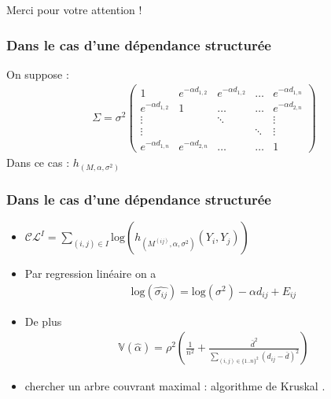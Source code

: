 \documentclass[11pt,table]{beamer}
\begin{document}
\begin{frame}
\begin{center}
Merci pour votre attention ! 
\end{center}
\end{frame}

\begin{frame}
\frametitle{Dans le cas d'une dépendance structurée}
On suppose :
\begin{align*}
\Sigma = \sigma^2 \begin{pmatrix}
1 &  e^{-\alpha d_{1,2}} &  e^{-\alpha d_{1,2}} & \ldots &  e^{- \alpha d_{1,n}}  \\
 e^{-\alpha d_{1,2}} & 1 & \ldots & \ldots &  e^{- \alpha d_{2,n}}\\
 \vdots & & \ddots & & \vdots\\
 \vdots & & & \ddots & \vdots \\
 e^{-\alpha d_{1,n}} &  e^{-\alpha d_{2,n}} & \ldots & \ldots & 1 
\end{pmatrix}
\end{align*} 
Dans ce cas : $h_{(M,\alpha,\sigma^2)}$
\end{frame}

\begin{frame}
\frametitle{Dans le cas d'une dépendance structurée}
\begin{itemize}
\item $\mathcal{CL}^I = \sum_{(i,j) \in I} \mathrm{log}( h_{(M^{(ij)},\alpha,\sigma^2)}(Y_i,Y_j)) $
 \item Par regression linéaire on a 
\begin{align*}
\mathrm{log}(\widehat{\sigma_{ij}}) = \mathrm{log} ( \sigma^2) - \alpha d_{ij} + E_{ij}
\end{align*}

\item De plus\begin{align*}
\mathbb{V}(\widehat{\alpha}) = \rho^2 (\frac{1}{n^2} + \frac{\bar{d}^2}{\sum_{(i,j)\in \{1..n\}^2}(d_{ij} - \bar{d})^2})
\end{align*}
\item chercher un arbre couvrant maximal : algorithme de Kruskal \cite{Kruskal1956}.
\end{itemize}
\end{frame}



\end{document}
